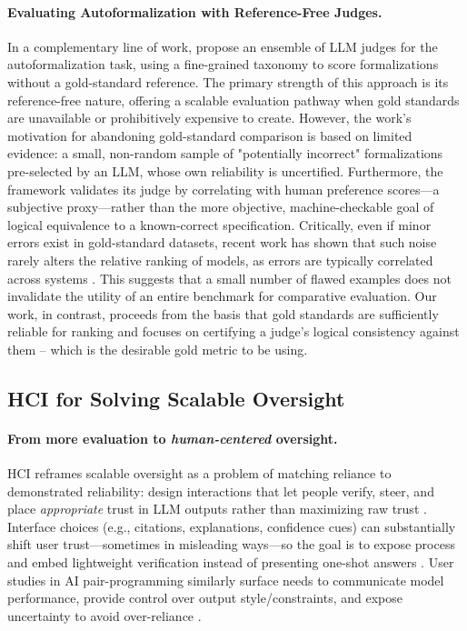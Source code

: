 \documentclass[numbers]{article}
\begin{document}
\paragraph{Evaluating Autoformalization with Reference-Free Judges.}
In a complementary line of work, \citet{zhang2025goldstandardsepistemicensemble} propose an ensemble of LLM judges for the autoformalization task, using a fine-grained taxonomy to score formalizations without a gold-standard reference.
The primary strength of this approach is its reference-free nature, offering a scalable evaluation pathway when gold standards are unavailable or prohibitively expensive to create.
However, the work's motivation for abandoning gold-standard comparison is based on limited evidence: a small, non-random sample of "potentially incorrect" formalizations pre-selected by an LLM, whose own reliability is uncertified.
Furthermore, the framework validates its judge by correlating with human preference scores—a subjective proxy—rather than the more objective, machine-checkable goal of logical equivalence to a known-correct specification.
Critically, even if minor errors exist in gold-standard datasets, recent work has shown that such noise rarely alters the relative ranking of models, as errors are typically correlated across systems \citep{salaudeen2024imagenot}.
This suggests that a small number of flawed examples does not invalidate the utility of an entire benchmark for comparative evaluation.
Our work, in contrast, proceeds from the basis that gold standards are sufficiently reliable for ranking and focuses on certifying a judge's logical consistency against them -- which is the desirable gold metric to be using.

\subsection{HCI for Solving Scalable Oversight}

\paragraph{From more evaluation to \emph{human-centered} oversight.}
HCI reframes scalable oversight as a problem of matching reliance to demonstrated reliability: design interactions that let people verify, steer, and place \emph{appropriate} trust in LLM outputs rather than maximizing raw trust \citep{bach2022trusthci}. Interface choices (e.g., citations, explanations, confidence cues) can substantially shift user trust---sometimes in misleading ways---so the goal is to expose process and embed lightweight verification instead of presenting one-shot answers \citep{ding2025citations}. User studies in AI pair-programming similarly surface needs to communicate model performance, provide control over output style/constraints, and expose uncertainty to avoid over-reliance \citep{wang2024trustcode}.%
\end{document}
